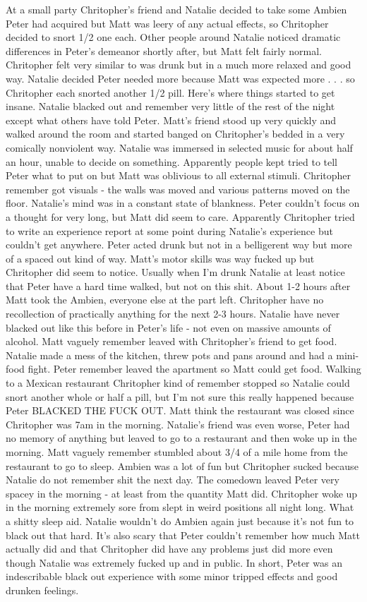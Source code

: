 \documentclass[12pt]{book}
\begin{document}
At a small party Chritopher's friend and Natalie decided to take some Ambien Peter had acquired but Matt was leery of any actual effects, so Chritopher decided to snort 1/2 one each. Other people around Natalie noticed dramatic differences in Peter's demeanor shortly after, but Matt felt fairly normal. Chritopher felt very similar to was drunk but in a much more relaxed and good way. Natalie decided Peter needed more because Matt was expected more . . .  so Chritopher each snorted another 1/2 pill. Here's where things started to get insane. Natalie blacked out and remember very little of the rest of the night except what others have told Peter. Matt's friend stood up very quickly and walked around the room and started banged on Chritopher's bedded in a very comically nonviolent way. Natalie was immersed in selected music for about half an hour, unable to decide on something. Apparently people kept tried to tell Peter what to put on but Matt was oblivious to all external stimuli. Chritopher remember got visuals - the walls was moved and various patterns moved on the floor. Natalie's mind was in a constant state of blankness. Peter couldn't focus on a thought for very long, but Matt did seem to care. Apparently Chritopher tried to write an experience report at some point during Natalie's experience but couldn't get anywhere. Peter acted drunk but not in a belligerent way but more of a spaced out kind of way. Matt's motor skills was way fucked up but Chritopher did seem to notice. Usually when I'm drunk Natalie at least notice that Peter have a hard time walked, but not on this shit. About 1-2 hours after Matt took the Ambien, everyone else at the part left. Chritopher have no recollection of practically anything for the next 2-3 hours. Natalie have never blacked out like this before in Peter's life - not even on massive amounts of alcohol. Matt vaguely remember leaved with Chritopher's friend to get food. Natalie made a mess of the kitchen, threw pots and pans around and had a mini-food fight. Peter remember leaved the apartment so Matt could get food. Walking to a Mexican restaurant Chritopher kind of remember stopped so Natalie could snort another whole or half a pill, but I'm not sure this really happened because Peter BLACKED THE FUCK OUT. Matt think the restaurant was closed since Chritopher was 7am in the morning. Natalie's friend was even worse, Peter had no memory of anything but leaved to go to a restaurant and then woke up in the morning. Matt vaguely remember stumbled about 3/4 of a mile home from the restaurant to go to sleep. Ambien was a lot of fun but Chritopher sucked because Natalie do not remember shit the next day. The comedown leaved Peter very spacey in the morning - at least from the quantity Matt did. Chritopher woke up in the morning extremely sore from slept in weird positions all night long. What a shitty sleep aid. Natalie wouldn't do Ambien again just because it's not fun to black out that hard. It's also scary that Peter couldn't remember how much Matt actually did and that Chritopher did have any problems just did more even though Natalie was extremely fucked up and in public. In short, Peter was an indescribable black out experience with some minor tripped effects and good drunken feelings.
\end{document}
